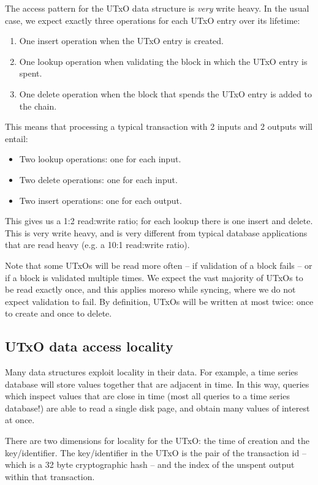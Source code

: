 \documentclass[11pt,a4paper]{article}
\begin{document}
The access pattern for the UTxO data structure is \emph{very} write heavy. In
the usual case, we expect exactly three operations for each UTxO entry over its
lifetime:
\begin{enumerate}
\item One {\sc insert} operation when the UTxO entry is created.
\item One {\sc lookup} operation when validating the block in which the UTxO
      entry is spent.
\item One {\sc delete} operation when the block that spends the UTxO entry is
      added to the chain.
\end{enumerate}
This means that processing a typical transaction with 2 inputs and 2 outputs
will entail:
\begin{itemize}
\setlength{\itemsep}{0pt}%
\setlength{\parskip}{1pt}%
\item Two {\sc lookup} operations: one for each input.
\item Two {\sc delete} operations: one for each input.
\item Two {\sc insert} operations: one for each output.
\end{itemize}
This gives us a 1:2 read:write ratio; for each {\sc lookup} there is one
{\sc insert} and {\sc delete}. This is very write heavy, and is very different
from typical database applications that are read heavy (e.g. a 10:1 read:write
ratio).

Note that some UTxOs will be read more often -- if validation of a block fails
-- or if a block is validated multiple times. We expect the vast majority of
UTxOs to be read exactly once, and this applies moreso while syncing, where we
do not expect validation to fail. By definition, UTxOs will be written at most
twice: once to create and once to delete.

\subsection{UTxO data access locality}
\label{locality}

Many data structures exploit locality in their data. For example, a time series
database will store values together that are adjacent in time. In this way,
queries which inspect values that are close in time (most all queries to a time
series database!) are able to read a single disk page, and obtain many values
of interest at once.

There are two dimensions for locality for the UTxO: the time of creation and
the key/identifier. The key/identifier in the UTxO is the pair of the
transaction id -- which is a 32 byte cryptographic hash -- and the index of the
unspent output within that transaction.
\end{document}
